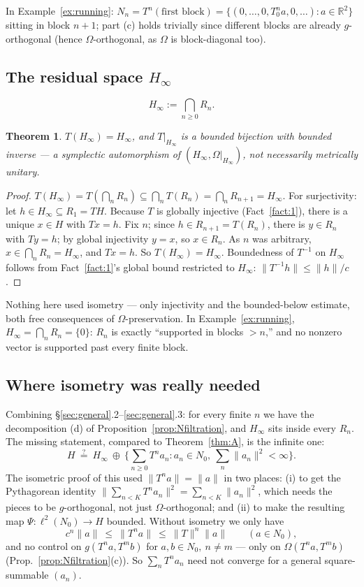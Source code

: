 \documentclass[11pt,a4paper]{article}
\newtheorem{theorem}{Theorem}[section]
\theoremstyle{definition}
\theoremstyle{remark}
\newcommand{\R}{\mathbb{R}}
\newcommand{\Om}{\Omega}
\begin{document}
In Example~\ref{ex:running}: $N_n=T^n(\text{first block})=\{(0,\dots,0,T_0^na,0,\dots):a\in\R^2\}$
sitting in block $n+1$; part (c) holds trivially since different blocks are already
$g$-orthogonal (hence $\Om$-orthogonal, as $\Om$ is block-diagonal too).

\subsection{The residual space $H_\infty$}

\[
H_\infty:=\bigcap_{n\ge0}R_n.
\]

\begin{theorem}
\label{thm:Hinfty}
$T(H_\infty)=H_\infty$, and $T|_{H_\infty}$ is a bounded bijection with bounded inverse ---
a \emph{symplectic automorphism} of $(H_\infty,\Om|_{H_\infty})$, not necessarily
metrically unitary.
\end{theorem}
\begin{proof}
$T(H_\infty)=T(\bigcap_nR_n)\subseteq\bigcap_nT(R_n)=\bigcap_nR_{n+1}=H_\infty$. For
surjectivity: let $h\in H_\infty\subseteq R_1=TH$. Because $T$ is globally injective
(Fact~\ref{fact:1}), there is a unique $x\in H$ with $Tx=h$. Fix $n$; since
$h\in R_{n+1}=T(R_n)$, there is $y\in R_n$ with $Ty=h$; by global injectivity $y=x$, so
$x\in R_n$. As $n$ was arbitrary, $x\in\bigcap_nR_n=H_\infty$, and $Tx=h$. So
$T(H_\infty)=H_\infty$. Boundedness of $T^{-1}$ on $H_\infty$ follows from
Fact~\ref{fact:1}'s global bound restricted to $H_\infty$: $\|T^{-1}h\|\le\|h\|/c$.
\end{proof}

Nothing here used isometry --- only injectivity and the bounded-below estimate, both free
consequences of $\Om$-preservation. In Example~\ref{ex:running},
$H_\infty=\bigcap_nR_n=\{0\}$: $R_n$ is exactly ``supported in blocks $>n$,'' and no nonzero
vector is supported past every finite block.

\subsection{Where isometry was really needed}

Combining \S\ref{sec:general}.2--\ref{sec:general}.3: for every finite $n$ we have the
decomposition (d) of Proposition~\ref{prop:Nfiltration}, and $H_\infty$ sits inside every
$R_n$. The missing statement, compared to Theorem~\ref{thm:A}, is the infinite one:
\[
H\ \overset{?}{=}\ H_\infty\ \oplus\ \Big\{\textstyle\sum_{n\ge0}T^na_n: a_n\in N_0,\
\textstyle\sum_n\|a_n\|^2<\infty\Big\}.
\]
The isometric proof of this used $\|T^na\|=\|a\|$ in two places: (i) to get the Pythagorean
identity $\|\sum_{n<K}T^na_n\|^2=\sum_{n<K}\|a_n\|^2$, which needs the pieces to be
$g$-orthogonal, not just $\Om$-orthogonal; and (ii) to make the resulting map
$\Psi:\ell^2(N_0)\to H$ bounded. Without isometry we only have
\[
c^n\|a\|\ \le\ \|T^na\|\ \le\ \|T\|^n\|a\|\qquad(a\in N_0),
\]
and no control on $g(T^na,T^mb)$ for $a,b\in N_0,\ n\ne m$ --- only on $\Om(T^na,T^mb)$
(Prop.~\ref{prop:Nfiltration}(c)). So $\sum_nT^na_n$ need not converge for a general
square-summable $(a_n)$.
\end{document}
